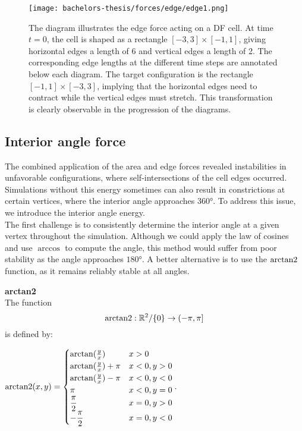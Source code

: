 \begin{figure}
	\begin{center}
		\texttt{[image: bachelors-thesis/forces/edge/edge1.png]}
		\caption{The diagram illustrates the edge force acting on a DF cell.
		At time $t=0$, the cell is shaped as a rectangle $[-3,3]\times [-1,1]$, giving horizontal edges a length of 6 and vertical edges a length of 2.
		The corresponding edge lengths at the different time steps are annotated below each diagram.
		The target configuration is the rectangle $[-1,1]\times [-3,3]$, implying that the horizontal edges need to contract while the vertical edges must stretch.
		This transformation is clearly observable in the progression of the diagrams.
		}
		\label{fig:edgeForce}
	\end{center}
\end{figure}





\subsection{Interior angle force}
The combined application of the area and edge forces revealed instabilities in unfavorable configurations, where self-intersections of the cell edges occurred. 
Simulations without this energy sometimes can also result in constrictions at certain vertices, where the interior angle approaches $360$°. 
To address this issue, we introduce the interior angle energy. \\
The first challenge is to consistently determine the interior angle at a given vertex throughout the simulation.
Although we could apply the law of cosines and use $\arccos$ to compute the angle, this method would suffer from poor stability as the angle approaches $180$°.
A better alternative is to use the $\operatorname{arctan2}$ function, as it remains reliably stable at all angles. \\

\begin{definition} \textbf{arctan2} \\
	The function $$\operatorname{arctan2}:\mathbb{R}^2/\{0\} \rightarrow (-\pi, \pi]$$ is defined by:
	\begin{center}
		$ \operatorname{arctan2}(x,y) = 
		\begin{cases}
			\arctan(\frac{y}{x}) & x > 0 \\
			\arctan(\frac{y}{x}) + \pi & x < 0, y > 0 \\
			\arctan(\frac{y}{x}) - \pi & x < 0, y < 0 \\
			\pi & x < 0, y = 0 \\
			\dfrac{\pi}{2} & x = 0, y > 0 \\ 		
			- \dfrac{\pi}{2} & x = 0, y < 0 \\ 
		\end{cases}. $
	\end{center}
\end{definition}

